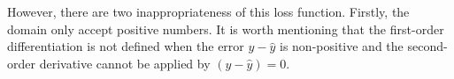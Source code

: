 \documentclass[runningheads]{llncs}
\begin{document}

However, there are two inappropriateness of this loss function. Firstly, the domain only accept positive numbers. It is worth mentioning that the first-order differentiation is not defined when the error $y-\hat{y}$ is non-positive and the second-order derivative cannot be applied by $(y-\hat{y}) = 0$. 



\end{document}
